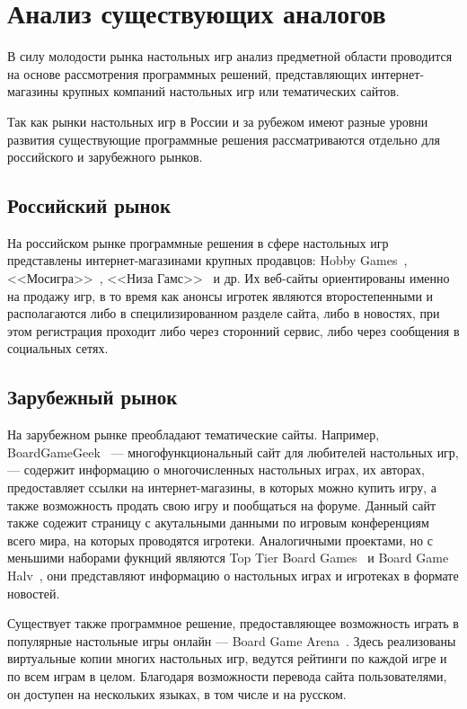 \section{Анализ существующих аналогов}

В силу молодости рынка настольных игр анализ предметной области проводится на
основе рассмотрения программных решений, представляющих интернет-магазины
крупных компаний настольных игр или тематических сайтов.

Так как рынки настольных игр в России и за рубежом имеют разные уровни развития
существующие программные решения рассматриваются отдельно для российского и
зарубежного рынков.

\subsection{Российский рынок}

На российском рынке программные решения в сфере настольных игр представлены
интернет-магазинами крупных продавцов: Hobby Games~\cite{site01},
<<Мосигра>>~\cite{site02}, <<Низа Гамс>>~\cite{site03} и др. Их веб-сайты
ориентированы именно на продажу игр, в то время как анонсы игротек являются
второстепенными и располагаются либо в специлизированном разделе сайта, либо в
новостях, при этом регистрация проходит либо через сторонний сервис, либо через
сообщения в социальных сетях.

\subsection{Зарубежный рынок}

На зарубежном рынке преобладают тематические сайты. Например,
BoardGameGeek~\cite{site04} --- многофункциональный сайт для любителей
настольных игр, --- содержит информацию о многочисленных настольных играх, их
авторах, предоставляет ссылки на интернет-магазины, в которых можно купить игру,
а также возможность продать свою игру и пообщаться на форуме. Данный сайт также
содежит страницу с акутальными данными по игровым конференциям всего мира, на
которых проводятся игротеки. Аналогичными проектами, но с меньшими наборами
фукнций являются Top Tier Board Games~\cite{site05} и Board Game
Halv~\cite{site06}, они представляют информацию о настольных играх и игротеках в
формате новостей.

Существует также программное решение, предоставляющее возможность играть в
популярные настольные игры онлайн --- Board Game Arena~\cite{site07}. Здесь
реализованы виртуальные копии многих настольных игр, ведутся рейтинги по каждой
игре и по всем играм в целом. Благодаря возможности перевода сайта
пользователями, он доступен на нескольких языках, в том числе и на русском.

